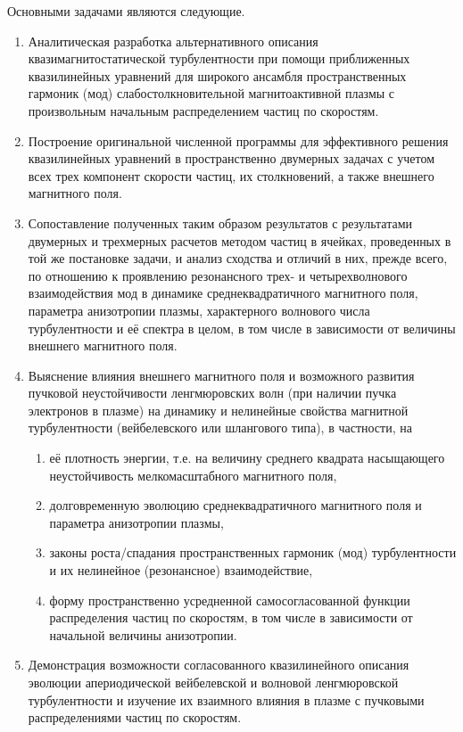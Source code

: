 Основными задачами являются следующие.
\begin{enumerate}
    \item Аналитическая разработка альтернативного описания квазимагнитостатической турбулентности при помощи приближенных квазилинейных уравнений для широкого ансамбля пространственных гармоник (мод) слабостолкновительной магнитоактивной плазмы с произвольным начальным распределением частиц по скоростям.
    
    \item Построение оригинальной численной программы для эффективного решения квазилинейных уравнений в пространственно двумерных задачах с учетом всех трех компонент скорости частиц, их столкновений, а также внешнего магнитного поля.
    
    \item Сопоставление полученных таким образом результатов с результатами двумерных и трехмерных расчетов методом частиц в ячейках, проведенных в той же постановке задачи, и анализ сходства и отличий в них, прежде всего, по отношению к проявлению резонансного трех- и четырехволнового взаимодействия мод в динамике среднеквадратичного магнитного поля, параметра анизотропии плазмы, характерного волнового числа турбулентности и её спектра в целом, в том числе в зависимости от величины внешнего магнитного поля.
    
    \item Выяснение влияния внешнего магнитного поля и возможного развития пучковой неустойчивости ленгмюровских волн (при наличии пучка электронов в плазме) на динамику и нелинейные свойства магнитной турбулентности (вейбелевского или шлангового типа), в частности, на
    \begin{enumerate}
        \item её плотность энергии, т.е. на величину среднего квадрата насыщающего неустойчивость мелкомасштабного магнитного поля,  
        \item долговременную эволюцию среднеквадратичного магнитного поля и параметра анизотропии плазмы,
        \item законы роста/спадания пространственных гармоник (мод) турбулентности и их нелинейное (резонансное) взаимодействие, 
        \item форму пространственно усредненной самосогласованной функции распределения частиц по скоростям, в том числе в зависимости от начальной величины анизотропии.
    \end{enumerate}

    \item Демонстрация возможности согласованного квазилинейного описания эволюции апериодической вейбелевской и волновой ленгмюровской турбулентности и изучение их взаимного влияния в плазме с пучковыми распределениями частиц по скоростям. 
    

\end{enumerate}

